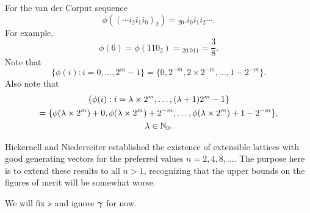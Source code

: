 \documentclass{amsart}
\begin{document}
For the van der Corput sequence
\[
\phi((\cdots i_2 i_1 i_0)_2) = {}_20.i_0 i_1 i_2 \cdots.
\]
For example,
\[
\phi(6) = \phi(110_2) = {}_20.011 = \frac 38.
\]
Note that
\begin{equation} \label{eq:phipropone}
\{ \phi(i) : i = 0, \ldots, 2^m-1 \} = \{0, 2^{-m}, 2\times 2^{-m}, \ldots, 1 - 2^{-m} \}.
\end{equation}
Also note that 
\begin{multline} \label{eq:phiproptwo}
\{ \phi(i) : i = \lambda \times 2^m , \ldots, (\lambda+1)2^m-1 \} \\
= \{\phi(\lambda \times 2^m) + 0, \phi(\lambda \times 2^m) + 2^{-m}, \ldots, \phi(\lambda \times 2^m) + 1 - 2^{-m} \} , \\
\lambda \in \mathbb{N}_{0}.
\end{multline}


Hickernell and Niederreiter \cite{HicNie03a} established the existence of extensible lattices with good generating vectors for the preferred values $n = 2, 4, 8, \ldots$.  The purpose here is to extend these results to all $n>1$, recognizing that the upper bounds on the figures of merit will be somewhat worse.

We will fix $s$ and ignore $\boldsymbol{\gamma}$ for now.
\end{document}
